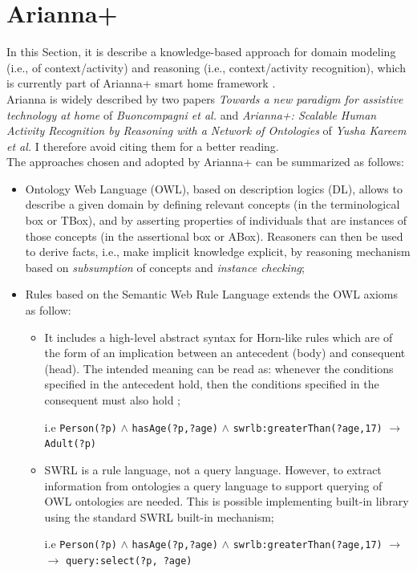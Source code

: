 \documentclass{thesisreport}
\begin{document}
 \section{Arianna+} \label{Arianna}    
 In this Section, it is describe a knowledge-based approach for domain modeling (i.e., of context/activity) and reasoning (i.e., context/activity recognition), which is currently part of Arianna+ smart home framework \cite{kareem2018arianna}. \\
 Arianna is widely described by two papers \textit{Towards a new paradigm for assistive technology at home} of \textit{Buoncompagni et al.} and \textit{Arianna+: Scalable Human Activity Recognition by Reasoning with a Network of Ontologies} of \textit{Yusha Kareem et al.} I therefore avoid citing them for a better reading. \\
 The approaches chosen and adopted by Arianna+ can be summarized as follows:
 \begin{itemize}
     \item Ontology Web Language (OWL), based on description logics (DL), allows to describe a given domain by defining relevant concepts (in the terminological box or TBox), and by asserting properties of individuals that are instances of those concepts (in the assertional box or ABox).
     Reasoners can then be used to derive facts, i.e., make implicit knowledge explicit, by reasoning mechanism \cite{donini1994deduction} based on \textit{subsumption} of concepts and \textit{instance checking};
     \item Rules based on the Semantic Web Rule Language extends the OWL axioms as follow:
    \begin{itemize}
        \item It includes a high-level abstract syntax for Horn-like rules which are of the form of an implication between an antecedent (body) and consequent (head). The intended meaning can be read as: whenever the conditions specified in the antecedent hold, then the conditions specified in the consequent must also hold \cite{horrocks2004swrl};
        
        i.e \texttt{Person(?p)} $\wedge$ \texttt{hasAge(?p,?age)} $\wedge$ \texttt{swrlb:greaterThan(?age,17)} $\rightarrow$ \texttt{Adult(?p)}
        
        \item SWRL is a rule language, not a query language. However, to extract information from ontologies a query language to support querying of OWL ontologies are needed.
        This is possible implementing  built-in library using the standard SWRL built-in mechanism; 
        
         i.e \texttt{Person(?p)} $\wedge$ \texttt{hasAge(?p,?age)} $\wedge$ \texttt{swrlb:greaterThan(?age,17)} $\rightarrow$ \\  $\rightarrow$ \texttt{query:select(?p, ?age)}
        
    \end{itemize}
 \end{itemize}
 
\end{document}
